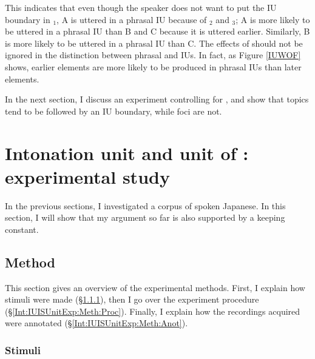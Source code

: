 This indicates that even though the speaker does not want to put the IU boundary in \tp{\dvline}$_1$,
A is uttered in a phrasal IU because of \tp{\dvline}$_2$ and \tp{\dvline}$_3$;
A is more likely to be uttered in a phrasal IU than B and C because it is uttered earlier.
Similarly, B is more likely to be uttered in a phrasal IU than C.
The effects of  should not be ignored in the distinction between phrasal and  IUs.
In fact,
as Figure \ref{IUWOF} shows,
earlier elements are more likely to be produced in phrasal IUs
than later elements.

In the next section,
I discuss an experiment controlling for ,
and show that topics tend to be followed by an IU boundary,
while foci are not.




\section[IU and IS unit: experimental study]{Intonation unit and unit of : experimental study}\label{Int:IUISUnitExp}

In the previous sections,
I investigated a corpus of spoken Japanese.
In this section,
I will show that my argument so far is also supported by a  keeping  constant.


\subsection{Method}\label{Int:IUISUnitExp:Meth}

This section gives an overview of the experimental methods.
First, I explain how stimuli were made (\S \ref{Int:IUISUnitExp:Meth:Sti}),
then I go over the experiment procedure (\S \ref{Int:IUISUnitExp:Meth:Proc}).
Finally,
I explain how the recordings acquired were annotated (\S \ref{Int:IUISUnitExp:Meth:Anot}).

\subsubsection{Stimuli}\label{Int:IUISUnitExp:Meth:Sti}

